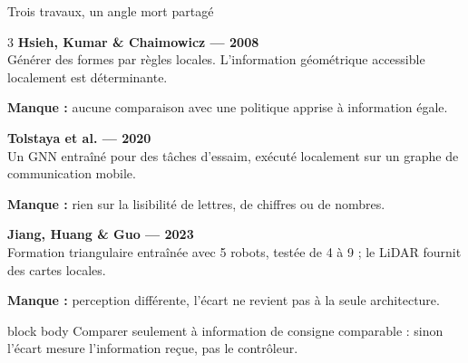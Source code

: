 \documentclass[10pt,aspectratio=169]{beamer}
\begin{document}
\begin{frame}{Trois travaux, un angle mort partagé}
  \begin{multicols}{3}
    \textbf{\color{swarmblue}Hsieh, Kumar \& Chaimowicz --- 2008}\\[0.2em]
    Générer des formes par règles locales. L'information géométrique accessible localement est déterminante.\par
    {\footnotesize\color{swarmmuted}\textbf{Manque :} aucune comparaison avec une politique apprise à information égale.\par}
    \columnbreak
    \textbf{\color{swarmblue}Tolstaya et al. --- 2020}\\[0.2em]
    Un GNN entraîné pour des tâches d'essaim, exécuté localement sur un graphe de communication mobile.\par
    {\footnotesize\color{swarmmuted}\textbf{Manque :} rien sur la lisibilité de lettres, de chiffres ou de nombres.\par}
    \columnbreak
    \textbf{\color{swarmblue}Jiang, Huang \& Guo --- 2023}\\[0.2em]
    Formation triangulaire entraînée avec 5 robots, testée de 4 à 9 ; le LiDAR fournit des cartes locales.\par
    {\footnotesize\color{swarmmuted}\textbf{Manque :} perception différente, l'écart ne revient pas à la seule architecture.\par}
  \end{multicols}
  \vspace{0.3cm}
  \begin{beamercolorbox}[wd=\textwidth,rounded=false,leftskip=0.4cm,dp=1.4em]{block body}
    Comparer seulement à information de consigne comparable : sinon l'écart mesure l'information reçue, pas le contrôleur.
  \end{beamercolorbox}
\end{frame}
\end{document}
